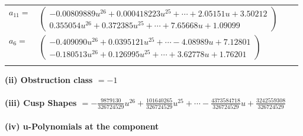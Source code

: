 \documentclass[1p]{elsarticle_modified}
\theoremstyle{definition}
\begin{document}
\begin{tabular}{m{7pt} m{180pt} m{7pt} m{180pt} }
\flushright $a_{11}=$&$\begin{pmatrix}-0.00809889 u^{26}+0.000418223 u^{25}+\cdots+2.05151 u+3.50212\\0.355054 u^{26}+0.372385 u^{25}+\cdots+7.65668 u+1.09099\end{pmatrix}$ \\
\flushright $a_{6}=$&$\begin{pmatrix}-0.409090 u^{26}+0.0395121 u^{25}+\cdots-4.08989 u+7.12801\\-0.180513 u^{26}+0.126995 u^{25}+\cdots+3.62778 u+1.76201\end{pmatrix}$\\&\end{tabular}
\flushleft \textbf{(ii) Obstruction class $= -1$}\\~\\
\flushleft \textbf{(iii) Cusp Shapes $= -\frac{9879130}{326724529} u^{26}+\frac{101640265}{326724529} u^{25}+\cdots-\frac{4373584718}{326724529} u+\frac{3242559308}{326724529}$}\\~\\
\newpage\renewcommand{\arraystretch}{1}
\flushleft \textbf{(iv) u-Polynomials at the component}\newline \\
\end{document}
